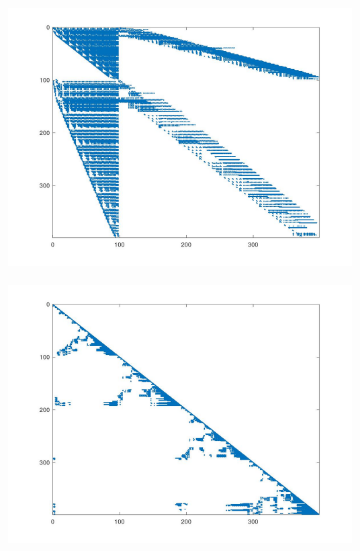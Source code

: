 \begin{figure}[h!]
	\centering
	\begin{subfigure}[h]{.48\textwidth}
		\centering
		\includegraphics[width=\textwidth]{data/LLU}
		\label{fig:LLU}
	\end{subfigure}
	\begin{subfigure}[h]{.48\textwidth}
		\centering
		\includegraphics[width=\textwidth]{data/LLUPQ}
		\label{fig:LLUPQ}
	\end{subfigure}
	\begin{subfigure}[h]{.48\textwidth}
		\centering

\end{subfigure}
\end{figure}
